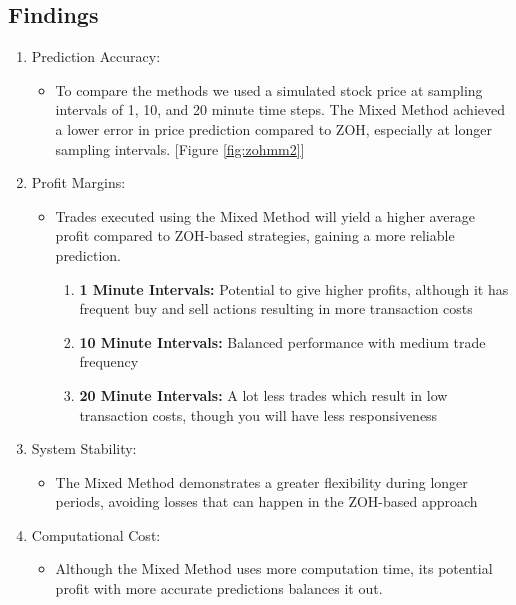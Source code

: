 \documentclass{article}
\begin{document}
\subsection{Findings}
\begin{enumerate}
\item Prediction Accuracy:
    \begin{itemize}
        \item To compare the methods we used a  simulated stock price at sampling intervals of 1, 10, and 20 minute time steps. The Mixed Method achieved a lower error in price prediction compared to ZOH, especially at longer sampling intervals. [Figure \ref{fig:zohmm2}]
    \end{itemize}
\item Profit Margins:
    \begin{itemize}
        \item Trades executed using the Mixed Method will yield a higher average profit compared to ZOH-based strategies, gaining a more reliable prediction.
            \begin{enumerate}[label=\roman*.]
                \item \textbf{1 Minute Intervals:} Potential to give higher profits, although it has frequent buy and sell actions resulting in  more transaction costs
                \item \textbf{10 Minute Intervals:} Balanced performance with medium trade frequency
                \item \textbf{20 Minute Intervals:} A lot less trades which result in low transaction costs, though you will have less responsiveness
            \end{enumerate}
    \end{itemize}
\item System Stability:
    \begin{itemize}
        \item The Mixed Method demonstrates a  greater flexibility during longer periods, avoiding losses that can happen in the ZOH-based approach
    \end{itemize}
\item Computational Cost:
    \begin{itemize}
        \item Although the Mixed Method uses more computation time, its potential profit with more accurate predictions balances it out. 
    \end{itemize}
\end{enumerate}
\end{document}
